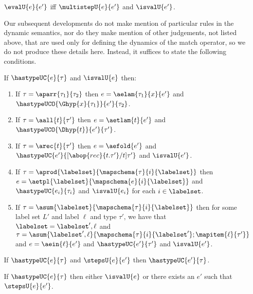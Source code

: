 \begin{definition}[Evaluation]\label{defn:evaluation-UP}  $\evalU{e}{e'}$ iff $\multistepU{e}{e'}$ and $\isvalU{e'}$. \end{definition}

Our subsequent developments do not make mention of particular rules in the dynamic semantics, nor do they make mention of other judgements, not listed above,  that are used only for defining the dynamics of the match operator, so we do not produce these details here. Instead, it suffices to state the following conditions.

\begin{condition}\label{condition:canonical-forms-UP} If $\hastypeUC{e}{\tau}$ and $\isvalU{e}$ then:
\begin{enumerate}
\item If $\tau=\aparr{\tau_1}{\tau_2}$ then $e=\aelam{\tau_1}{x}{e'}$ and $\hastypeUCO{\Ghyp{x}{\tau_1}}{e'}{\tau_2}$.
\item If $\tau=\aall{t}{\tau'}$ then $e=\aetlam{t}{e'}$ and $\hastypeUCO{\Dhyp{t}}{e'}{\tau'}$.
\item If $\tau=\arec{t}{\tau'}$ then $e=\aefold{e'}$ and $\hastypeUC{e'}{[\abop{rec}{t.\tau'}/t]\tau'}$ and $\isvalU{e'}$. 
\item If $\tau=\aprod{\labelset}{\mapschema{\tau}{i}{\labelset}}$ then $e=\aetpl{\labelset}{\mapschema{e}{i}{\labelset}}$ and $\hastypeUC{e_i}{\tau_i}$ and $\isvalU{e_i}$ for each $i \in \labelset$.
\item If $\tau=\asum{\labelset}{\mapschema{\tau}{i}{\labelset}}$ then for some label set $L'$ and label $\ell$ and type $\tau'$, we have that $\labelset=\labelset', \ell$ and $\tau=\asum{\labelset', \ell}{\mapschema{\tau}{i}{\labelset'}; \mapitem{\ell}{\tau'}}$ and $e=\aein{\ell}{e'}$ and $\hastypeUC{e'}{\tau'}$ and $\isvalU{e'}$.
\end{enumerate}\end{condition}


\begin{condition}[Preservation]\label{condition:preservation-UP} If $\hastypeUC{e}{\tau}$ and $\stepsU{e}{e'}$ then $\hastypeUC{e'}{\tau}$. \end{condition}

\begin{condition}[Progress]\label{condition:progress-UP} If $\hastypeUC{e}{\tau}$ then either $\isvalU{e}$  or there exists an $e'$ such that $\stepsU{e}{e'}$. \end{condition}

